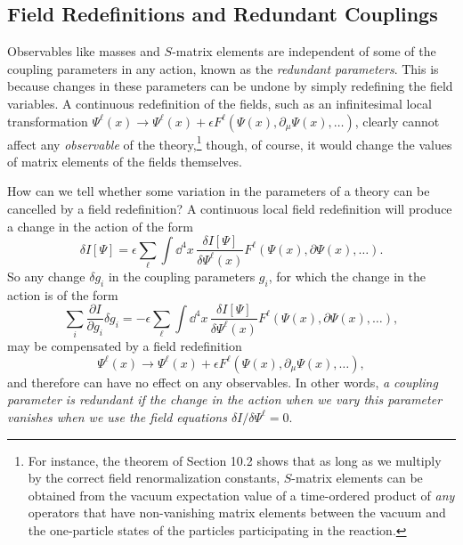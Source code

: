 
\subsection[Field Redefinitions and Redundant Couplings]{Field Redefinitions and Redundant
Couplings\texorpdfstring{\protect\footnotemark}{}}

Observables like masses and $S$-matrix elements are independent of some of the
coupling parameters in any action, known as the \emph{redundant parameters}.
This is because changes in these parameters can be undone by simply redefining
the field variables. A continuous redefinition of the fields, such as an
infinitesimal local transformation
$\Psi^\ell(x)\to\Psi^\ell(x)+\epsilon F^\ell(\Psi(x),
\partial_\mu\Psi(x),\ldots)$, clearly cannot affect any \emph{observable} of
the theory,\footnote{For instance, the theorem of Section 10.2 shows that as
long as we multiply by the correct field renormalization constants, $S$-matrix
elements can be obtained from the vacuum expectation value of a time-ordered
product of \emph{any} operators that have non-vanishing matrix elements
between the vacuum and the one-particle states of the particles participating
in the reaction.} though, of course, it would change the values of matrix
elements of the fields themselves.

How can we tell whether some variation in the parameters of a theory can be
cancelled by a field redefinition? A continuous local field redefinition will
produce a change in the action of the form
\begin{equation}
\delta I[\Psi]=\epsilon\sum_\ell\int \dd^4x\,
\frac{\delta I[\Psi]}{\delta\Psi^\ell(x)}
F^\ell(\Psi(x),\partial\Psi(x),\ldots).
\tag{7.7.1}\label{eq:7.7.1}
\end{equation}
So any change $\delta g_i$ in the coupling parameters $g_i$, for which the
change in the action is of the form
\begin{equation}
\sum_i\frac{\partial I}{\partial g_i}\delta g_i
=-\epsilon\sum_\ell\int \dd^4x\,
\frac{\delta I[\Psi]}{\delta\Psi^\ell(x)}
F^\ell(\Psi(x),\partial\Psi(x),\ldots),
\tag{7.7.2}\label{eq:7.7.2}
\end{equation}
may be compensated by a field redefinition
\[
\Psi^\ell(x)\to\Psi^\ell(x)+\epsilon F^\ell
(\Psi(x),\partial_\mu\Psi(x),\ldots),
\]
and therefore can have no effect on any observables. In other words,
\emph{a coupling parameter is redundant if the change in the action when we
vary this parameter vanishes when we use the field equations
$\delta I/\delta\Psi^\ell=0$}.

